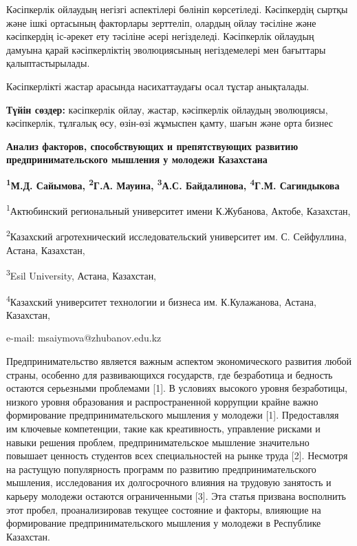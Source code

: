 Кәсіпкерлік ойлаудың негізгі аспектілері бөлініп көрсетіледі.
Кәсіпкердің сыртқы және ішкі ортасының факторлары зерттеліп, олардың
ойлау тәсіліне және кәсіпкердің іс-әрекет ету тәсіліне әсері
негізделеді. Кәсіпкерлік ойлаудың дамуына қарай кәсіпкерліктің
эволюциясының негіздемелері мен бағыттары қалыптастырылады.

Кәсіпкерлікті жастар арасында насихаттаудағы осал тұстар анықталады.

{\bfseries Түйін сөздер:} кәсіпкерлік ойлау, жастар, кәсіпкерлік ойлаудың
эволюциясы, кәсіпкерлік, тұлғалық өсу, өзін-өзі жұмыспен қамту, шағын
және орта бизнес

{\bfseries Анализ факторов, способствующих и препятствующих развитию
предпринимательского мышления у молодежи Казахстана}

{\bfseries \textsuperscript{1}М.Д. Сайымова\textsuperscript{\envelope },
\textsuperscript{2}Г.А. Мауина, \textsuperscript{3}А.С. Байдалинова,
\textsuperscript{4}Г.М. Сагиндыкова}

\textsuperscript{1}Актюбинский региональный университет имени
К.Жубанова, Актобе, Казахстан,

\textsuperscript{2}Казахский агротехнический исследовательский
университет им. С. Сейфуллина, Астана, Казахстан,

\textsuperscript{3}Esil University, Астана, Казахстан,

\textsuperscript{4}Казахский университет технологии и бизнеса им.
К.Кулажанова, Астана, Казахстан,

e-mail: msaiymova@zhubanov.edu.kz

Предпринимательство является важным аспектом экономического развития
любой страны, особенно для развивающихся государств, где безработица и
бедность остаются серьезными проблемами {[}1{]}. В условиях высокого
уровня безработицы, низкого уровня образования и распространенной
коррупции крайне важно формирование предпринимательского мышления у
молодежи {[}1{]}. Предоставляя им ключевые компетенции, такие как
креативность, управление рисками и навыки решения проблем,
предпринимательское мышление значительно повышает ценность студентов
всех специальностей на рынке труда {[}2{]}. Несмотря на растущую
популярность программ по развитию предпринимательского мышления,
исследования их долгосрочного влияния на трудовую занятость и карьеру
молодежи остаются ограниченными {[}3{]}. Эта статья призвана восполнить
этот пробел, проанализировав текущее состояние и факторы, влияющие на
формирование предпринимательского мышления у молодежи в Республике
Казахстан.

